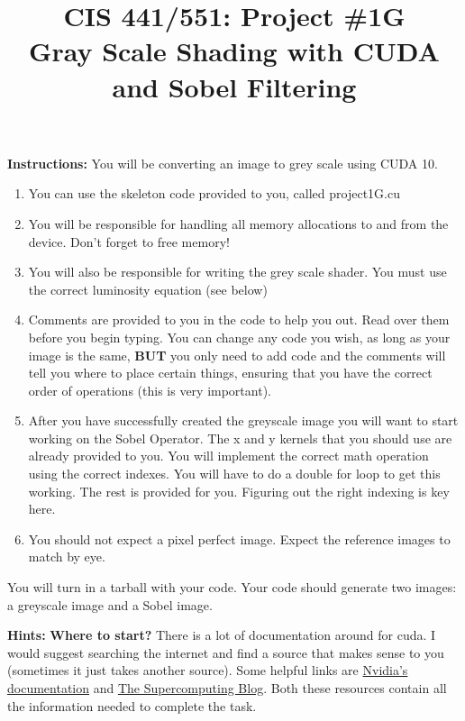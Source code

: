 \documentclass[12pt,letter]{article}
\begin{document}
\title{CIS 441/551: Project \#1G\\
       \large Gray Scale Shading with CUDA and Sobel Filtering}
\date{}
\maketitle

\large{\textbf{Instructions:}}
You will be converting an image to grey scale using CUDA 10.
\begin{enumerate}
    \item You can use the skeleton code provided to you, called project1G.cu
    \item You will be responsible for handling all memory allocations to and 
          from the device. Don't forget to free memory!
    \item You will also be responsible for writing the grey scale shader. You
          must use the correct luminosity equation (see below)
    \item Comments are provided to you in the code to help you out. Read over
          them before you begin typing. You can change any code you wish, as
          long as your image is the same, \textbf{BUT} you only need to add
          code and the comments will tell you where to place certain things,
          ensuring that you have the correct order of operations (this is
          very important).
    \item After you have successfully created the greyscale image you will
          want to start working on the Sobel Operator. The x and y kernels
          that you should use are already provided to you. You will implement
          the correct math operation using the correct indexes. You will have 
          to do a double for loop to get this working. The rest is provided for
          you. Figuring out the right indexing is key here.
    \item You should not expect a pixel perfect image. Expect the reference
          images to match by eye. 
\end{enumerate}

You will turn in a tarball with your code. Your code should generate two images:
a greyscale image and a Sobel image.

\large{\textbf{Hints:}}
\textbf{Where to start?} There is a lot of documentation around for cuda. I 
would suggest searching the internet and find a source that makes sense to you
(sometimes it just takes another source). Some helpful links are 
\href{https://www.nvidia.com/docs/IO/116711/sc11-cuda-c-basics.pdf}{Nvidia's
documentation} and 
\href{http://supercomputingblog.com/cuda/cuda-tutorial-1-getting-started/}
{The Supercomputing Blog}. Both these resources contain all the information
needed to complete the task. 
\end{document}
